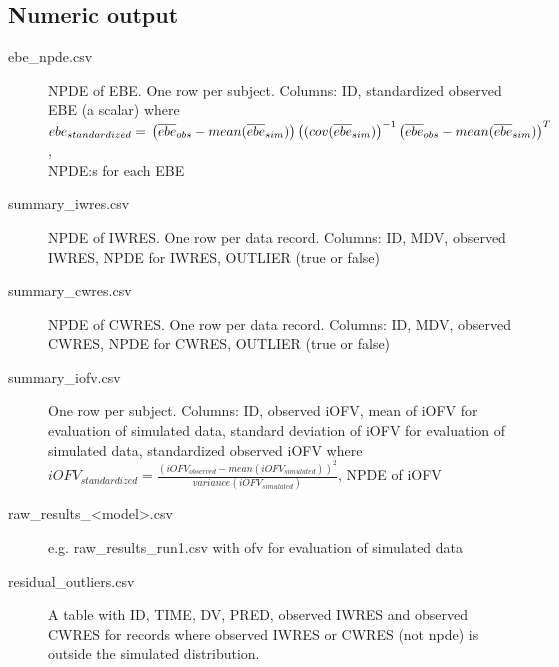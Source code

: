 \subsection{Numeric output}
\begin{description}
\item[ebe\_npde.csv] NPDE of EBE. One row per subject. Columns: ID,
standardized observed EBE (a scalar) where 
$ebe_{standardized}= \\
\left(\overline{ebe}_{obs} - mean (\overline{ebe}_{sim})\right)\left((cov(\overline{ebe}_{sim})\right)^{-1}
\left(\overline{ebe}_{obs} - mean (\overline{ebe}_{sim})\right)^T$,\\ 
NPDE:s for each EBE
\item[summary\_iwres.csv] NPDE of IWRES. One row per data record. Columns: ID, MDV, observed IWRES, NPDE for IWRES, OUTLIER (true or false)
\item[summary\_cwres.csv] NPDE of CWRES. One row per data record. Columns: ID, MDV, observed CWRES, NPDE for CWRES, OUTLIER (true or false)
\item[summary\_iofv.csv] One row per subject. Columns: ID, observed iOFV,
mean of iOFV for evaluation of simulated data,
standard deviation of iOFV for evaluation of simulated data,
standardized observed iOFV where
$iOFV_{standardized}=\frac{(iOFV_{observed} - mean (iOFV_{simulated}))^2}{variance(iOFV_{simulated})}$, NPDE of iOFV
\item[raw\_results\_<model>.csv] e.g. raw\_results\_run1.csv with ofv for evaluation of simulated data
\item[residual\_outliers.csv] A table with ID, TIME, DV, PRED, observed IWRES and observed CWRES for records
where observed IWRES or CWRES (not npde) is outside the simulated distribution.
\end{description}

